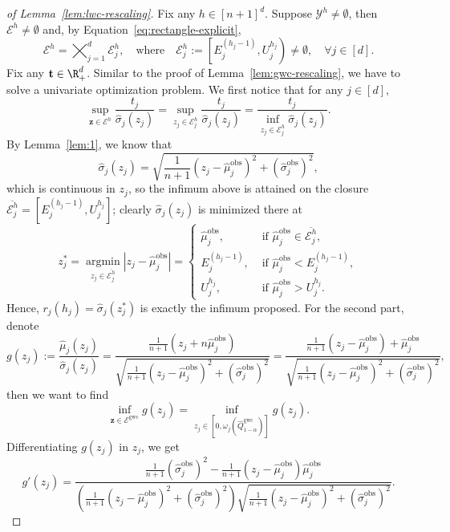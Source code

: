 \begin{proof}[of Lemma~\ref{lem:lwc-rescaling}]
Fix any $h \in [n+1]^d$.
Suppose $\mathcal{Y}^h \neq \emptyset$, then $\mathcal{E}^h \neq \emptyset$ and,
by Equation~\eqref{eq:rectangle-explicit},
\[
\mathcal{E}^h = \bigtimes_{j=1}^{d} \mathcal{E}^h_j,
\quad\text{where}\quad
\mathcal{E}^h_j :=\left[E^{(h_j-1)}_j, U^{h_j}_j\right) \neq \emptyset, \quad \forall j \in [d].
\]
Fix any $\mathbf t \in \R^d_+$. Similar to the proof of Lemma~\ref{lem:gwc-rescaling}, we have to solve a univariate optimization problem. We first notice that for any $j \in [d]$,
\[
\sup_{\mathbf z \in \mathcal{E}^h} \frac{t_j}{\hat{\sigma}_{j}(z_j)}= \sup_{z_j \in \mathcal{E}^h_j} \frac{t_j}{\hat{\sigma}_{j}(z_j)} = \frac{t_j}{\inf_{z_j \in \mathcal{E}^h_j}\hat{\sigma}_{j}(z_j)}.
\]
By Lemma~\ref{lem:1}, we know that
\[
\hat{\sigma}_{j}(z_j) = \sqrt{\frac{1}{n+1}(z_j - \hat{\mu}^\mathrm{obs}_j)^2 + (\hat{\sigma}^\mathrm{obs}_j)^2},
\]
which is continuous in $z_j$, so the infimum above is attained on the closure $\overline{\mathcal{E}^h_j} = \left[E^{(h_j-1)}_j, U^{h_j}_j\right]$; clearly $\hat{\sigma}_{j}(z_j)$ is minimized there at 
\[
z^*_j = \operatorname*{argmin}_{z_j \in \overline{\mathcal{E}^h_j}}|z_j-\hat{\mu}^\mathrm{obs}_j| = \begin{cases}
    \hat{\mu}^\mathrm{obs}_j, &\text{ if }\hat{\mu}^\mathrm{obs}_j \in \overline{\mathcal{E}^h_j},\\
    E^{(h_j-1)}_j, &\text{ if } \hat{\mu}^\mathrm{obs}_j< E^{(h_j-1)}_j,\\
    U^{h_j}_j, &\text{ if }\hat{\mu}^\mathrm{obs}_j >  U^{h_j}_j.
\end{cases}
\]
Hence, $r_j(h_j) = \hat{\sigma}_{j}(z^*_j)$ is exactly the infimum proposed. 
\noindent
For the second part, denote
\[
g(z_j):=\frac{\hat{\mu}_{j}(z_j)}{\hat{\sigma}_{j}(z_j)} 
= \frac{\tfrac{1}{n+1}(z_j+n\hat{\mu}^\mathrm{obs}_j)}{\sqrt{\tfrac{1}{n+1}(z_j-\hat{\mu}^\mathrm{obs}_j)^2+(\hat{\sigma}^\mathrm{obs}_j)^2}}=\frac{\tfrac{1}{n+1}(z_j-\hat{\mu}^\mathrm{obs}_j)+\hat{\mu}^\mathrm{obs}_j}{\sqrt{\tfrac{1}{n+1}(z_j-\hat{\mu}^\mathrm{obs}_j)^2+(\hat{\sigma}^\mathrm{obs}_j)^2}},
\]
then we want to find
\[
\inf_{\mathbf z \in \mathcal{E}^{\mathrm{gwc}}}g(z_j) = \inf_{z_j \in [0, \omega_j(\hat{Q}^{\mathrm{gwc}}_{1-\alpha})]}g(z_j).
\]
Differentiating $g(z_j)$ in $z_j$, we get
\[
g'(z_j) = \frac{\frac{1}{n+1}(\hat{\sigma}^\mathrm{obs}_j)^2-\frac{1}{n+1}(z_j-\hat{\mu}^\mathrm{obs}_j)\hat{\mu}^\mathrm{obs}_j}{(\tfrac{1}{n+1}(z_j-\hat{\mu}^\mathrm{obs}_j)^2+(\hat{\sigma}^\mathrm{obs}_j)^2)\sqrt{\tfrac{1}{n+1}(z_j-\hat{\mu}^\mathrm{obs}_j)^2+(\hat{\sigma}^\mathrm{obs}_j)^2}}.
\]
\end{proof}
